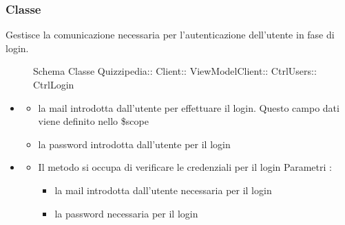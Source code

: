\subsubsection{Classe }
Gestisce la comunicazione necessaria per l'autenticazione dell'utente in fase di login.
\begin{figure}[H]
\centering
\noindent{}
\caption[Schema Classe CtrlLogin]{Schema Classe Quizzipedia:: Client:: ViewModelClient:: CtrlUsers:: CtrlLogin}
\end{figure}
\begin{itemize}
\item {}
\begin{itemize}
\item {}
\newline
la mail introdotta dall'utente per effettuare il login. Questo campo dati viene definito nello \$scope
\item {}
\newline
la password introdotta dall'utente per il login
\end{itemize}
\item {}
\begin{itemize}
\item {}
\newline
Il metodo si occupa di verificare le credenziali per il login
\newline
Parametri :
\begin{itemize}
\item {}
\newline
la mail introdotta dall'utente necessaria per il login
\item {}
\newline
la password necessaria per il login
\end{itemize}
\end{itemize}
\end{itemize}
